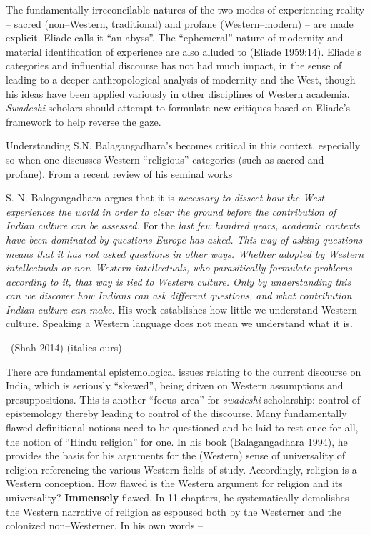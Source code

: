 The fundamentally irreconcilable natures of the two modes of experiencing reality – sacred (non–Western, traditional) and profane (Western–modern) – are made explicit. Eliade calls it “an abyss”. The “ephemeral” nature of modernity and material identification of experience are also alluded to (Eliade 1959:14). Eliade's categories and influential discourse has not had much impact, in the sense of leading to a deeper anthropological analysis of modernity and the West, though his ideas have been applied variously in other disciplines of Western academia. \textit{Swadeshi} scholars should attempt to formulate new critiques based on Eliade's framework to help reverse the gaze.

\newpage

Understanding S.N. Balagangadhara's becomes critical in this context, especially so when one discusses Western “religious” categories (such as sacred and profane). From a recent review of his seminal works

\begin{myquote}
S. N. Balagangadhara argues that it is \textit{necessary to dissect how the West experiences the world in order to clear the ground before the contribution of Indian culture can be assessed.} For the \textit{last few hundred years, academic contexts have been dominated by questions Europe has asked. This way of asking questions means that it has not asked questions in other ways. Whether adopted by Western intellectuals or non–Western intellectuals, who parasitically formulate problems according to it, that way is tied to Western culture. Only by understanding this can we discover how Indians can ask different questions, and what contribution Indian culture can make.} His work establishes how little we understand Western culture. Speaking a Western language does not mean we understand what it is. 

~\hfill (Shah 2014) (italics ours)
\end{myquote}

There are fundamental epistemological issues relating to the current discourse on India, which is seriously “skewed”, being driven on Western assumptions and presuppositions. This is another “focus–area” for \textit{swadeshi} scholarship: control of epistemology thereby leading to control of the discourse. Many fundamentally flawed definitional notions need to be questioned and be laid to rest once for all, the notion of “Hindu religion” for one. In his book (Balagangadhara 1994), he provides the basis for his arguments for the (Western) sense of universality of religion referencing the various Western fields of study. Accordingly, religion is a Western conception. How flawed is the Western argument for religion and its universality? \textbf{Immensely} flawed. In 11 chapters, he systematically demolishes the Western narrative of religion as espoused both by the Westerner and the colonized non–Westerner. In his own words –

